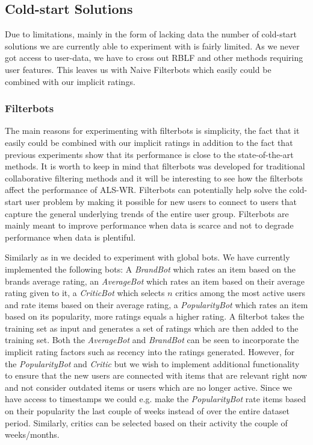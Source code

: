 \subsection{Cold-start Solutions}

Due to limitations, mainly in the form of lacking data the number of cold-start solutions
we are currently able to experiment with is fairly limited. As we never got access to
user-data, we have to cross out RBLF and other methods requiring user features. This leaves us with
Naive Filterbots \cite{Park2006} which easily could be combined with our implicit ratings.

\subsubsection{Filterbots}

The main reasons for experimenting with filterbots is simplicity, the fact that it easily could
be combined with our implicit ratings in addition to the fact that previous experiments \cite{Agarwal2009, Agarwal2010} show that its performance is close to the state-of-the-art methods. It is worth to keep in mind that filterbots was developed for traditional collaborative filtering methods and it will be interesting to see how the filterbots affect the performance of ALS-WR. Filterbots can potentially help solve the cold-start user problem by making it possible for new users to connect to users that capture the general underlying trends of the entire user group. Filterbots are mainly meant to improve performance when data is scarce and not to degrade performance when data is plentiful.

Similarly as in \cite{Park2006} we decided to experiment with global bots. We have currently implemented the following bots: A \emph{BrandBot} which rates an item based on the brands average rating, an \emph{AverageBot} which rates an item based on their average rating given to it, a \emph{CriticBot} which selects $n$ critics among the most active users and rate items based on their average rating, a \emph{PopularityBot} which rates an item based on its popularity, more ratings equals a higher rating. A filterbot takes the training set as input and generates a set of ratings which are then added to the training set. Both the \emph{AverageBot} and \emph{BrandBot} can be seen to incorporate the implicit rating factors such as recency into the ratings generated. However, for the \emph{PopularityBot} and \emph{Critic} but we wish to implement additional functionality to ensure that the new users are connected with items that are relevant right now and not consider outdated items or users which are no longer active. Since we have access to timestamps we could e.g. make the \emph{PopularityBot} rate items based on their popularity the last couple of weeks instead of over the entire dataset period. Similarly, critics can be selected based on their activity the couple of weeks/months.


